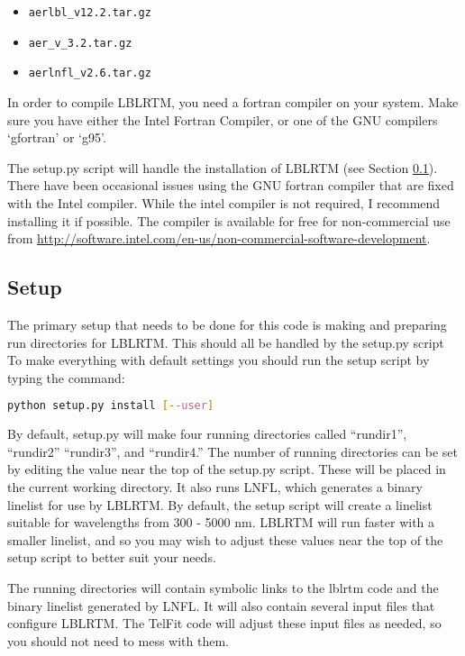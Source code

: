 \documentclass{article}
\begin{document}
\begin{itemize}
\item \verb|aerlbl_v12.2.tar.gz|
\item \verb|aer_v_3.2.tar.gz|
\item \verb|aerlnfl_v2.6.tar.gz|
\end{itemize}

In order to compile LBLRTM, you need a fortran compiler on your system. Make sure you have either the Intel Fortran Compiler, or one of the GNU compilers `gfortran' or `g95'.

The setup.py script will handle the installation of LBLRTM (see Section \ref{sec:setup}). There have been occasional issues using the GNU fortran compiler that are fixed with the Intel compiler. While the intel compiler is not required, I recommend installing it if possible. The compiler is available for free for non-commercial use from \url{http://software.intel.com/en-us/non-commercial-software-development}.



\subsection{Setup}
\label{sec:setup}

The primary setup that needs to be done for this code is making and preparing run directories for LBLRTM. This should all be handled by the setup.py script To make everything with default settings you should run the setup script by typing the command:
\begin{lstlisting}[language=bash]
   python setup.py install [--user]
\end{lstlisting}

By default, setup.py will make four running directories called ``rundir1'', ``rundir2'' ``rundir3'', and ``rundir4.'' The number of running directories can be set by editing the value near the top of the setup.py script. These will be placed in the current working directory.  It also runs LNFL, which generates a binary linelist for use by LBLRTM. By default, the setup script will create a linelist suitable for wavelengths from 300 - 5000 nm. LBLRTM will run faster with a smaller linelist, and so you may wish to adjust these values near the top of the setup script to better suit your needs.

The running directories will contain symbolic links to the lblrtm code and the binary linelist generated by LNFL. It will also contain several input files that configure LBLRTM. The TelFit code will adjust these input files as needed, so you should not need to mess with them.
\end{document}
